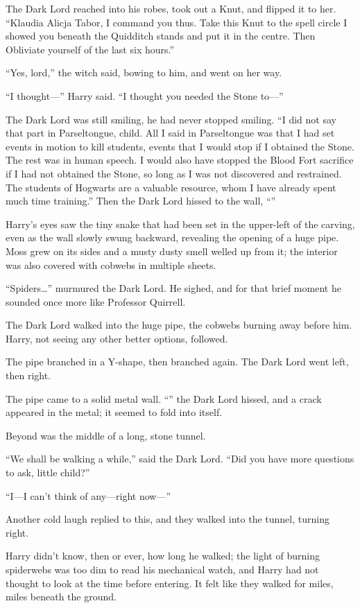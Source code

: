 The Dark Lord reached into his robes, took out a Knut, and flipped it to her. “Klaudia Alicja Tabor, I command you thus. Take this Knut to the spell circle I showed you beneath the Quidditch stands and put it in the centre. Then Obliviate yourself of the last six hours.”

“Yes, lord,” the witch said, bowing to him, and went on her way.

“I thought—” Harry said. “I thought you needed the Stone to—”

The Dark Lord was still smiling, he had never stopped smiling. “I did not say that part in Parseltongue, child. All I said in Parseltongue was that I had set events in motion to kill students, events that I would stop if I obtained the Stone. The rest was in human speech. I would also have stopped the Blood Fort sacrifice if I had not obtained the Stone, so long as I was not discovered and restrained. The students of Hogwarts are a valuable resource, whom I have already spent much time training.” Then the Dark Lord hissed to the wall, “”

Harry’s eyes saw the tiny snake that had been set in the upper-left of the carving, even as the wall slowly swung backward, revealing the opening of a huge pipe. Moss grew on its sides and a musty dusty smell welled up from it; the interior was also covered with cobwebs in multiple sheets.

“Spiders…” murmured the Dark Lord. He sighed, and for that brief moment he sounded once more like Professor Quirrell.

The Dark Lord walked into the huge pipe, the cobwebs burning away before him. Harry, not seeing any other better options, followed.

The pipe branched in a Y-shape, then branched again. The Dark Lord went left, then right.

The pipe came to a solid metal wall. “” the Dark Lord hissed, and a crack appeared in the metal; it seemed to fold into itself.

Beyond was the middle of a long, stone tunnel.

“We shall be walking a while,” said the Dark Lord. “Did you have more questions to ask, little child?”

“I—I can’t think of any—right now—”

Another cold laugh replied to this, and they walked into the tunnel, turning right.

Harry didn’t know, then or ever, how long he walked; the light of burning spiderwebs was too dim to read his mechanical watch, and Harry had not thought to look at the time before entering. It felt like they walked for miles, miles beneath the ground.

